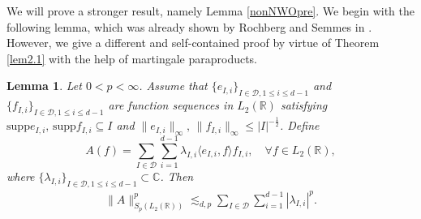 \documentclass[oneside,english,a4wide]{amsart}
\numberwithin{equation}{section}
\numberwithin{figure}{section}
\theoremstyle{plain}
\theoremstyle{plain}
\theoremstyle{definition}
\theoremstyle{plain}
\newtheorem{lemma}[thm]{Lemma}
\theoremstyle{remark}
\theoremstyle{definition}
\theoremstyle{remark}
\theoremstyle{definition}
\newcommand{\8}{\infty}
\begin{document}
We will prove a stronger result, namely Lemma \ref{nonNWOpre}. We begin with the following lemma, which was already shown by Rochberg and Semmes in \cite{RSe}. However, we give a different and self-contained proof by virtue of Theorem \ref{lem2.1} with the help of martingale paraproducts.
\begin{lemma}\label{nonNWOpre1}
	Let $0<p<\infty$. Assume that $\{e_{I,i}\}_{I\in\mathcal{D},1\le i\le d-1}$ and $\{f_{I,i}\}_{I\in\mathcal{D},1\le i\le d-1}$ are function sequences in $L_2(\mathbb{R})$ satisfying $\mathrm{supp}e_{I,i}, \,\mathrm{supp}f_{I,i}\subseteq I$ and
	$\|e_{I,i}\|_{\infty},\,\|f_{I,i}\|_{\infty}\le |I|^{-\frac{1}{2}}$. Define
	\begin{equation*}
		A(f)=\sum_{I\in \mathcal{D}}\sum_{i=1}^{d-1} \lambda_{I,i} \langle e_{I,i},f\rangle f_{I,i},\quad \forall f\in L_2(\mathbb{R}),
	\end{equation*}
	where $\{\lambda_{I,i}\}_{I\in\mathcal{D},1\le i\le d-1}\subset \mathbb{C}$.
	Then
	\begin{equation*}
		\begin{aligned}
			\|A\|^p_{S_p(L_2(\mathbb{R}))}\lesssim_{d,p}	\sum_{I\in\mathcal{D}}\sum_{i=1}^{d-1}|\lambda_{I,i}|^p.
		\end{aligned}
	\end{equation*}
\end{lemma}
\end{document}
